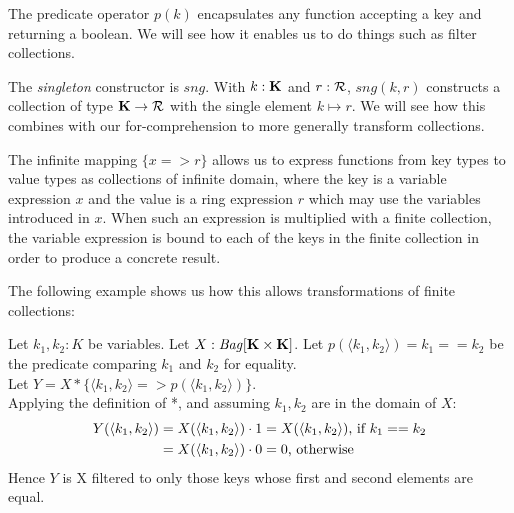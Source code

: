 {{{\vs The predicate operator $p(k)$ encapsulates any function accepting a key and returning a boolean. We will see how it enables us to do things such as filter collections.
 
\vs The \textit{singleton} constructor is $sng$. With $k: \mathbf{K}$ and $r: \mathcal{R}$, $sng(k,r)$ constructs a collection of type $\mathbf{K} \rightarrow \mathcal{R}$ with the single element $k  \mapsto r$. We will see how this combines with our for-comprehension to more generally transform collections.
 
\vs The infinite mapping $\{x => r\}$ allows us to express functions from key types to value types as collections of infinite domain, where the key is a variable expression $x$ and the value is a ring expression $r$ which may use the variables introduced in $x$. When such an expression is multiplied with a finite collection, the variable expression is bound to each of the keys in the finite collection in order to produce a concrete result.

The following example shows us how this allows transformations of finite collections:

\noindent Let $k_1,k_2: K$ be variables. Let $X: \textrm{\textit{Bag}}[\mathbf{K} \times \mathbf{K}]$. Let $p(\langle k_1, k_2 \rangle) = k_1 == k_2$ be the predicate comparing $k_1$ and $k_2$ for equality. \\
Let $Y = X * \{\langle k_1, k_2 \rangle => p(\langle k_1, k_2 \rangle)\}$. \\ Applying the definition of *, and assuming $k_1,k_2$ are in the domain of $X$: \\
\begin{equation*}
\begin{split}
Y(\langle k_1, k_2 \rangle) &= X(\langle k_1, k_2 \rangle) \cdot 1 = X(\langle k_1, k_2 \rangle)\textrm{, if } k_1 == k_2 \\
&= X(\langle k_1, k_2 \rangle) \cdot 0 = 0\textrm{, otherwise}
\end{split}
\end{equation*}
Hence $Y$ is X filtered to only those keys whose first and second elements are equal.

}}}
